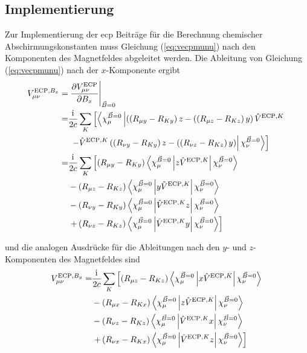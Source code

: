 	\subsection{Implementierung}
	Zur Implementierung der \ac{ecp} Beiträge für die Berechnung chemischer Abschirmungskonstanten muss Gleichung (\ref{eq:vecpmunu}) nach den Komponenten des Magnetfeldes abgeleitet werden. Die Ableitung von Gleichung (\ref{eq:vecpmunu}) nach der $x$-Komponente ergibt
	\begin{equation}\label{eq:vecpdbx}
	\begin{aligned}
	V_{\mu\nu}^{\textrm{ECP},B_x}=&\left.\frac{\partial V_{\mu\nu}^{\textrm{ECP}}}{\partial B_x}\right\vert_{\vec{B}=0}\\
	=&\frac{\mathrm{i}\mkern1mu}{2c}\sum_K\left[\left\langle\chi_\mu^{\vec{B}=0}\left\vert\left(\left(R_{\mu y}-R_{Ky}\right)z-(\left(R_{\mu z}-R_{Kz}\right)y\right)\hat{V}^{\textrm{ECP},K}\right.\right.\right.\\
	&\left.\left.\left.-\hat{V}^{\textrm{ECP},K}\left(\left(R_{\nu y}-R_{Ky}\right)z-(\left(R_{\nu z}-R_{Kz}\right)y\right)\right\vert\chi_\nu^{\vec{B}=0}\right\rangle\right]\\
	=&\frac{\mathrm{i}\mkern1mu}{2c}\sum_K\left[\left(R_{\mu y}-R_{Ky}\right)\left\langle\chi_\mu^{\vec{B}=0}\left\vert z\hat{V}^{\textrm{ECP},K}\right\vert\chi_\nu^{\vec{B}=0}\right\rangle\right.\\
	&-\left(R_{\mu z}-R_{Kz}\right)\left\langle\chi_\mu^{\vec{B}=0}\left\vert y\hat{V}^{\textrm{ECP},K}\right\vert\chi_\nu^{\vec{B}=0}\right\rangle\\
	&-\left(R_{\nu y}-R_{Ky}\right)\left\langle\chi_\mu^{\vec{B}=0}\left\vert \hat{V}^{\textrm{ECP},K} z\right\vert\chi_\nu^{\vec{B}=0}\right\rangle\\
	&\left.+\left(R_{\nu z}-R_{Kz}\right)\left\langle\chi_\mu^{\vec{B}=0}\left\vert \hat{V}^{\textrm{ECP},K} y\right\vert\chi_\nu^{\vec{B}=0}\right\rangle\right]
	\end{aligned}
	\end{equation}
	
	und die analogen Ausdrücke für die Ableitungen nach den $y$- und $z$- Komponenten des Magnetfeldes sind 
	\begin{equation}\label{eq:vecpdby}
	\begin{aligned}
	V_{\mu\nu}^{\textrm{ECP},B_y}=&\frac{\mathrm{i}\mkern1mu}{2c}\sum_K\left[\left(R_{\mu z}-R_{Kz}\right)\left\langle\chi_\mu^{\vec{B}=0}\left\vert x\hat{V}^{\textrm{ECP},K}\right\vert\chi_\nu^{\vec{B}=0}\right\rangle\right.\\
	&-\left(R_{\mu x}-R_{Kx}\right)\left\langle\chi_\mu^{\vec{B}=0}\left\vert z\hat{V}^{\textrm{ECP},K}\right\vert\chi_\nu^{\vec{B}=0}\right\rangle\\
	&-\left(R_{\nu z}-R_{Kz}\right)\left\langle\chi_\mu^{\vec{B}=0}\left\vert \hat{V}^{\textrm{ECP},K}x\right\vert\chi_\nu^{\vec{B}=0}\right\rangle\\
	&\left.+\left(R_{\nu x}-R_{Kx}\right)\left\langle\chi_\mu^{\vec{B}=0}\left\vert \hat{V}^{\textrm{ECP},K} z\right\vert\chi_\nu^{\vec{B}=0}\right\rangle\right]
	\end{aligned}
	\end{equation}
	
